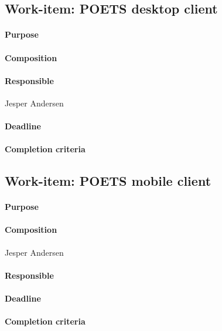 \documentclass[envcountsame]{llncs}
\begin{document}
\subsection*{Work-item: POETS desktop client}
\paragraph{Purpose}

\paragraph{Composition}

\paragraph{Responsible} Jesper Andersen

\paragraph{Deadline}

\paragraph{Completion criteria}

\subsection*{Work-item: POETS mobile client}
\paragraph{Purpose}

\paragraph{Composition} Jesper Andersen

\paragraph{Responsible}

\paragraph{Deadline}

\paragraph{Completion criteria}
\end{document}
